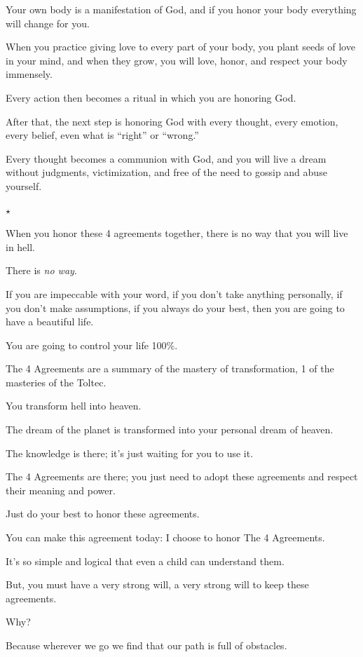\documentclass{article}
\numberwithin{equation}{section}
\begin{document}
Your own body is a manifestation of God, and if you honor your body everything will change for you.

When you practice giving love to every part of your body, you plant seeds of love in your mind, and when they grow, you will love, honor, and respect your body immensely.

%
Every action then becomes a ritual in which you are honoring God.

After that, the next step is honoring God with every thought, every emotion, every belief, even what is ``right'' or ``wrong.''

Every thought becomes a communion with God, and you will live a dream without judgments, victimization, and free of the need to gossip and abuse yourself.
\begin{center}
    $\star$
\end{center}

When you honor these 4 agreements together, there is no way that you will live in hell.

There is \textit{no way}.

If you are impeccable with your word, if you don't take anything personally, if you don't make assumptions, if you always do your best, then you are going to have a beautiful life.

You are going to control your life 100\%.

%
The 4 Agreements are a summary of the mastery of transformation, 1 of the masteries of the Toltec.

You transform hell into heaven.

The dream of the planet is transformed into your personal dream of heaven.

The knowledge is there; it's just waiting for you to use it.

The 4 Agreements are there; you just need to adopt these agreements and respect their meaning and power.

%
Just do your best to honor these agreements.

You can make this agreement today: I choose to honor The 4 Agreements.

It's so simple and logical that even a child can understand them.

But, you must have a very strong will, a very strong will to keep these agreements.

Why?

Because wherever we go we find that our path is full of obstacles.
\end{document}
